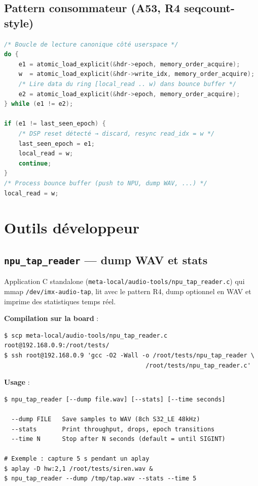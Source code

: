\documentclass[11pt,a4paper]{article}
\begin{document}
\subsection{Pattern consommateur (A53, R4 seqcount-style)}

\begin{lstlisting}[language=C]
/* Boucle de lecture canonique côté userspace */
do {
    e1 = atomic_load_explicit(&hdr->epoch, memory_order_acquire);
    w  = atomic_load_explicit(&hdr->write_idx, memory_order_acquire);
    /* Lire data du ring [local_read .. w) dans bounce buffer */
    e2 = atomic_load_explicit(&hdr->epoch, memory_order_acquire);
} while (e1 != e2);

if (e1 != last_seen_epoch) {
    /* DSP reset détecté → discard, resync read_idx = w */
    last_seen_epoch = e1;
    local_read = w;
    continue;
}
/* Process bounce buffer (push to NPU, dump WAV, ...) */
local_read = w;
\end{lstlisting}

\section{Outils développeur}

\subsection{\texttt{npu\_tap\_reader} — dump WAV et stats}

Application C standalone (\texttt{meta-local/audio-tools/npu\_tap\_reader.c}) qui
mmap \texttt{/dev/imx-audio-tap}, lit avec le pattern R4, dump optionnel en WAV
et imprime des statistiques temps réel.

\textbf{Compilation sur la board} :
\begin{lstlisting}
$ scp meta-local/audio-tools/npu_tap_reader.c root@192.168.0.9:/root/tests/
$ ssh root@192.168.0.9 'gcc -O2 -Wall -o /root/tests/npu_tap_reader \
                                       /root/tests/npu_tap_reader.c'
\end{lstlisting}

\textbf{Usage} :
\begin{lstlisting}
$ npu_tap_reader [--dump file.wav] [--stats] [--time seconds]

  --dump FILE   Save samples to WAV (8ch S32_LE 48kHz)
  --stats       Print throughput, drops, epoch transitions
  --time N      Stop after N seconds (default = until SIGINT)

# Exemple : capture 5 s pendant un aplay
$ aplay -D hw:2,1 /root/tests/siren.wav &
$ npu_tap_reader --dump /tmp/tap.wav --stats --time 5
\end{lstlisting}
\end{document}
